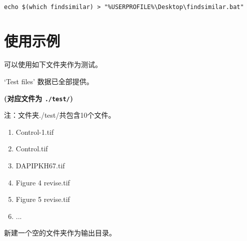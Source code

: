 \documentclass[
]{article}
\providecommand{\tightlist}{%
  \setlength{\itemsep}{0pt}\setlength{\parskip}{0pt}}
\begin{document}
\begin{tcolorbox}[colback = gray!10, colframe = red!50, width = 16cm, arc = 1mm, auto outer arc, title = {cmd input}]
\begin{verbatim}

echo $(which findsimilar) > "%USERPROFILE%\Desktop\findsimilar.bat"

\end{verbatim}
\end{tcolorbox}

\hypertarget{ux4f7fux7528ux793aux4f8b}{%
\section{使用示例}\label{ux4f7fux7528ux793aux4f8b}}

可以使用如下文件夹作为测试。

\begin{center}\vspace{1.5cm}\end{center}

`Test files' 数据已全部提供。

\textbf{(对应文件为 \texttt{./test/})}

\begin{center}\begin{tcolorbox}[colback=gray!10, colframe=gray!50, width=0.9\linewidth, arc=1mm, boxrule=0.5pt]注：文件夹./test/共包含10个文件。

\begin{enumerate}\tightlist
\item Control-1.tif
\item Control.tif
\item DAPIPKH67.tif
\item Figure 4 revise.tif
\item Figure 5 revise.tif
\item ...
\end{enumerate}\end{tcolorbox}
\end{center}

\begin{center}\vspace{1.5cm}\end{center}

新建一个空的文件夹作为输出目录。

\begin{center}\vspace{1.5cm}\end{center}
\end{document}
